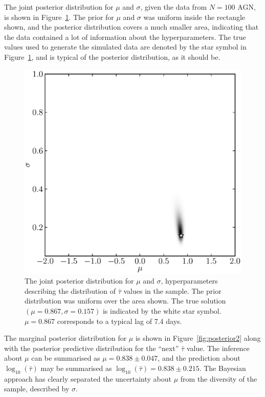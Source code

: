 \documentclass[useAMS,usenatbib]{mn2e}
\begin{document}
The joint posterior distribution for $\mu$ and
$\sigma$, given the data from $N=100$ AGN,
is shown in Figure~\ref{fig:posterior}. The prior for $\mu$ and $\sigma$
was uniform inside the rectangle shown, and the posterior distribution covers
a much smaller area, indicating that the data contained a lot of information
about the hyperparameters. The true values used to generate the simulated data
are denoted by the star symbol in Figure~\ref{fig:posterior},
and is typical of the posterior distribution, as it should be.

\begin{figure}
\begin{center}
\includegraphics[scale=0.5]{Figures/posterior.eps}
\caption{The joint posterior distribution for $\mu$ and $\sigma$, hyperparameters
describing the distribution of $\bar{\tau}$ values in the sample. The prior
distribution was uniform over the area shown.
The true solution $(\mu = 0.867, \sigma = 0.157)$
is indicated by the white star symbol. $\mu = 0.867$ corresponds to a typical
lag of 7.4 days.\label{fig:posterior}}
\end{center}
\end{figure}

The marginal posterior distribution for $\mu$ is shown in Figure~\ref{fig:posterior2}
along with the posterior predictive distribution for the ``next'' $\bar{\tau}$ value. The inference about $\mu$ can be summarised as
$\mu = 0.838 \pm 0.047$, and the prediction about $\log_{10}(\bar{\tau})$
may be summarised as $\log_{10}(\bar{\tau}) = 0.838 \pm 0.215$. The Bayesian
approach has clearly separated the uncertainty about $\mu$ from the diversity of the
sample, described by $\sigma$.
\end{document}
